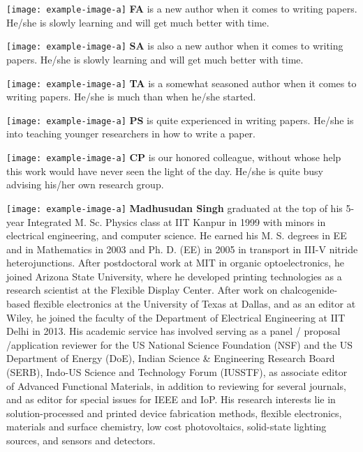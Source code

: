 \documentclass[12 pt]{article}
\begin{document}
\begin{description}
 \item {\texttt{[image: example-image-a]}} \textbf{FA} is a new author when it comes to writing papers. He/she is slowly learning and will get much better with time. %
 \item {\texttt{[image: example-image-a]}} \textbf{SA} is also a new author when it comes to writing papers. He/she is slowly learning and will get much better with time. %
 \item {\texttt{[image: example-image-a]}} \textbf{TA} is a somewhat seasoned author when it comes to writing papers. He/she is much than when he/she started. %
 \item {\texttt{[image: example-image-a]}} \textbf{PS} is quite experienced in writing papers. He/she is into teaching younger researchers in how to write a paper. %
 \item {\texttt{[image: example-image-a]}} \textbf{CP} is our honored colleague, without whose help this work would have never seen the light of the day. He/she is quite busy advising his/her own research group. %
 \item {\texttt{[image: example-image-a]}} \textbf{Madhusudan Singh} graduated at the top of his 5-year Integrated M. Sc. Physics class at IIT Kanpur in 1999 with minors in electrical engineering, and computer science. He earned his M. S. degrees in EE and in Mathematics in 2003 and Ph. D. (EE) in 2005 in transport in III-V nitride heterojunctions. After postdoctoral work at MIT in organic optoelectronics, he joined Arizona State University, where he developed printing technologies as a research scientist at the Flexible Display Center. After work on chalcogenide-based flexible electronics at the University of Texas at Dallas, and as an editor at Wiley, he joined the faculty of the Department of Electrical Engineering at IIT Delhi in 2013. His academic service has involved serving as a panel / proposal /application reviewer for the US National Science Foundation (NSF) and the US Department of Energy (DoE), Indian Science \& Engineering Research Board (SERB), Indo-US Science and Technology Forum (IUSSTF), as associate editor of Advanced Functional Materials, in addition to reviewing for several journals, and as editor for special issues for IEEE and IoP. His research interests lie in solution-processed and printed device fabrication methods, flexible electronics, materials and surface chemistry, low cost photovoltaics, solid-state lighting sources, and sensors and detectors. %
\end{description}
\end{document}
